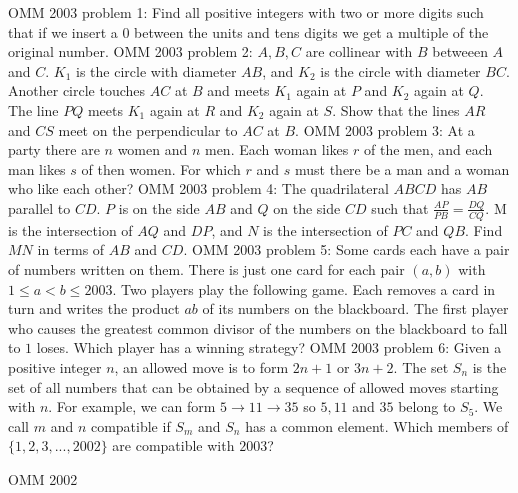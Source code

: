 OMM 2003 problem 1:  Find all positive integers with two or more digits such that if we insert a $0$ between the units and tens digits we get a multiple of the original number. 
OMM 2003 problem 2:  $A, B, C$ are collinear with $B$ betweeen $A$ and $C$. $K_1$ is the circle with diameter $AB$, and $K_2$ is the circle with diameter $BC$. Another circle touches $AC$ at $B$ and meets $K_1$ again at $P$ and $K_2$ again at $Q$. The line $PQ$ meets $K_1$ again at $R$ and $K_2$ again at $S$. Show that the lines $AR$ and $CS$ meet on the perpendicular to $AC$ at $B$. 
OMM 2003 problem 3:  At a party there are $n$ women and $n$ men. Each woman likes $r$ of the men, and each man likes $s$ of then women. For which $r$ and $s$ must there be a man and a woman who like each other? 
OMM 2003 problem 4:  The quadrilateral $ABCD$ has $AB$ parallel to $CD$. $P$ is on the side $AB$ and $Q$ on the side $CD$ such that $\frac{AP}{PB}= \frac{DQ}{CQ}$. M is the intersection of $AQ$ and $DP$, and $N$ is the intersection of $PC$ and $QB$. Find $MN$ in terms of $AB$ and $CD$. 
OMM 2003 problem 5:  Some cards each have a pair of numbers written on them. There is just one card for each pair $(a,b)$ with $1 \leq a < b \leq 2003$. Two players play the following game. Each removes a card in turn and writes the product $ab$ of its numbers on the blackboard. The first player who causes the greatest common divisor of the numbers on the blackboard to fall to $1$ loses. Which player has a winning strategy? 
OMM 2003 problem 6:  Given a positive integer $n$, an allowed move is to form $2n+1$ or $3n+2$. The set $S_n$ is the set of all numbers that can be obtained by a sequence of allowed moves starting with $n$. For example, we can form $5 \rightarrow 11 \rightarrow 35$ so $5, 11$ and $35$ belong to $S_5$. We call $m$ and $n$ compatible if $S_m$ and $S_n$ has a common element. Which members of $\{1, 2, 3, ... , 2002\}$ are compatible with $2003$? 

OMM 2002 


